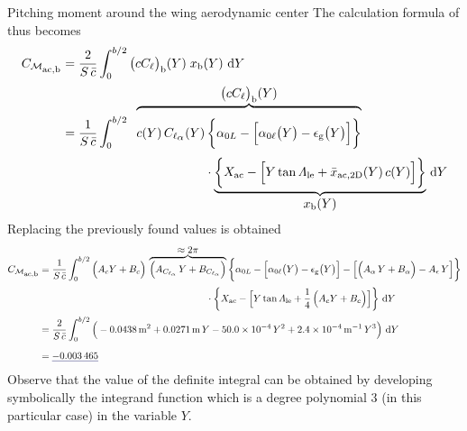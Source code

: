\documentclass[[12pt,twoside]{book}
\begin{document}
\begin{myExampleX}{Pitching moment around the wing aerodynamic center}{}
The calculation formula of  thus becomes
\[
\begin{split}
C_{\mathcal{M}_\mathlarger{\mathrm{ac,b}}} 
  & {}=
  \frac{2}{S\,\bar{c}} \int_0^{b/2} \big(cC_{\ell}\big)_\mathrm{b}(Y) \; x_\mathrm{b}(Y)\, \diff{Y}
\\[1pt]
  & {}=
  \frac{1}{S\,\bar{c}} \int_0^{b/2} \;\;
\overbrace{%
\rule{0pt}{2em}
c(Y) \, C_{\ell_\mathlarger{\alpha}}(Y) \,
    \bigg\{ \alpha_{0L} - \Big[ \alpha_{0\ell}\big(Y\big) - \epsilon_\mathrm{g}\big(Y\big) \Big] \bigg\}
}^{ \mathlarger{ \big(cC_{\ell}\big)_\mathrm{b}(Y) } }
\\[3pt]
  & \rule{4cm}{0pt}
%
    \cdot
    \underbrace{%
    \bigg\{ 
      X_\mathrm{ac} 
        - \Big[ Y \tan \Lambda_\mathrm{le} + \bar{x}_{\mathrm{ac,2D}} (Y) \, c(Y) \Big]
    \bigg\} 
    }_{ \mathlarger{ x_\mathrm{b}(Y) } }
    \, \diff{Y}
\end{split}
\]
\noindent
Replacing the previously found values is obtained
\[
 \begin{split}
C_{\mathcal{M}_\mathlarger{\mathrm{ac,b}}} 
  & {}=
  \frac{1}{S\,\bar{c}} \int_0^{b/2}
    \Big( A_c Y + B_c \Big)
    \, 
    \overbrace{%
      \Big( A_{C_{\ell_\alpha}} \, Y + B_{C_{\ell_\alpha}} \Big)
    }^{ \mathlarger{\approx 2\pi} }
    \bigg\{ \alpha_{0L} 
       - \Big[ \alpha_{0\ell}\big(Y\big) - \epsilon_\mathrm{g}\big(Y\big) \Big] 
      - \Big[ \Big( A_{\alpha} \, Y + B_{\alpha} \Big) - A_{\epsilon} \, Y \Big]
    \bigg\}
\\[2pt]
  & \hfill \rule{6cm}{0pt}
%
    \cdot
    \bigg\{ 
      X_\mathrm{ac} 
        - \Big[ Y \tan \Lambda_\mathrm{le} + \frac{1}{4} \, \Big( A_c Y + B_c \Big) \Big]
    \bigg\} 
    \, \diff{Y}
\\[2pt]
  & {}= 
  \frac{2}{S\,\bar{c}} \int_0^{b/2} 
    \Big( 
      \SI[round-mode=figures,round-precision=3,
        ]{\myCoeffEWing}{\metre^2}
      + 
      \SI[round-mode=figures,round-precision=3,
        ]{\myCoeffFWing}{\metre}\, Y
      \SI[round-mode=figures,round-precision=3,
        fixed-exponent=-4,
        scientific-notation=fixed %
        ]{\myCoeffGWing}{}\, Y^2
      +
      \SI[round-mode=figures,round-precision=2,
        fixed-exponent=-4,
        scientific-notation=fixed
        ]{\myCoeffHWing}{\metre^{-1}}\, Y^3
    \Big)
    \, \diff{Y}
\\[4pt]
  & {}= \mathunderline{mydarkblue}{ \SI[round-precision=5]{\myCmZeroBWing}{} }
\end{split}
\]
Observe that the value of the definite integral can be obtained by developing symbolically
the integrand function which is a degree polynomial $3$ (in this particular case) in the variable $Y$.


\end{myExampleX}
\end{document}
